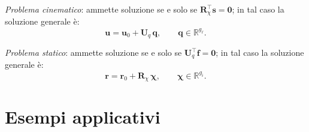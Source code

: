 \noindent\emph{Problema cinematico}: ammette soluzione
se e solo se $\bm{R}_\chi^{\top}\bm{s} = \bm{0}$;
in tal caso la soluzione generale è:
\begin{equation}\label{eq:sol_li_cin}
	\bm{u} = \bm{u}_0 + \bm{U}_q\,\bm{q},
	\qquad \bm{q} \in \mathbb{R}^{g_\ell}.
\end{equation}

\noindent\emph{Problema statico}: ammette soluzione
se e solo se $\bm{U}_q^{\top}\bm{f} = \bm{0}$;
in tal caso la soluzione generale è:
\begin{equation}\label{eq:sol_li_stat}
	\bm{r} = \bm{r}_0 + \bm{R}_\chi\,\bm{\chi},
	\qquad \bm{\chi} \in \mathbb{R}^{g_i}.
\end{equation}





\section{Esempi applicativi}\label{sec:esempi}


